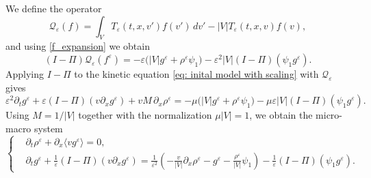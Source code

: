 \documentclass[11pt,twoside]{article}
\numberwithin{equation}{section}
\theoremstyle{plain}
\theoremstyle{nonumberplain}
\begin{document}
{%
We define the operator
\[
\mathcal{Q}_\varepsilon(f)
=
\int_V T_\varepsilon(t,x,v')f(v')\,dv'
-
|V|T_\varepsilon(t,x,v)f(v),
\]
and using \eqref{f_expansion} we obtain
\[
(I-\Pi)\mathcal Q_\varepsilon(f^\varepsilon)
=
-\varepsilon\bigl(|V|g^\varepsilon+\rho^\varepsilon\psi_1\bigr)
-\varepsilon^2|V|(I-\Pi)(\psi_1g^\varepsilon).
\]
Applying \(I-\Pi\) {to the kinetic equation \eqref{eq: inital model with scaling}} with
\(\mathcal Q_\varepsilon\) gives
\[
\varepsilon^2 \partial_t g^\varepsilon
+
\varepsilon (I-\Pi)(v\partial_x g^\varepsilon)
+
vM\,\partial_x \rho^\varepsilon
=
-\mu\bigl(|V|g^\varepsilon+\rho^\varepsilon\psi_1\bigr)
-\mu\varepsilon |V|(I-\Pi)(\psi_1g^\varepsilon).
\]
Using \(M=1/|V|\) together with the normalization \(\mu |V|=1\), we obtain
the micro-macro system
\begin{equation}\label{eq:micro-macro-normalized}
\left\{
\begin{aligned}
&\partial_t \rho^\varepsilon
+\partial_x \langle v g^\varepsilon\rangle = 0,\\
&\partial_t g^\varepsilon
+\frac1\varepsilon (I-\Pi)(v\partial_x g^\varepsilon)
=
\frac1{\varepsilon^2}
\left(
-\frac{v}{|V|}\partial_x \rho^\varepsilon
-g^\varepsilon
-\frac{\rho^\varepsilon}{|V|}\psi_1
\right)
-\frac1\varepsilon (I-\Pi)(\psi_1g^\varepsilon).
\end{aligned}
\right.
\end{equation}

}
\end{document}
